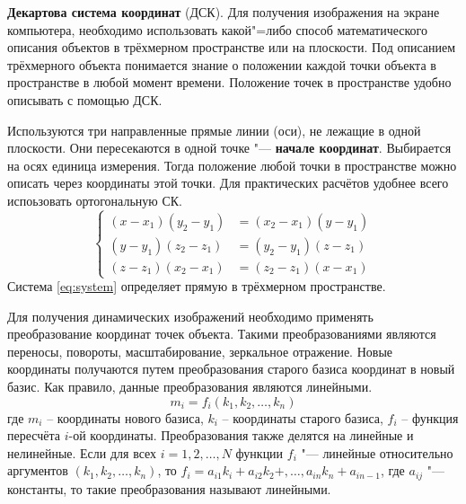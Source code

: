 \textbf{Декартова система координат} (ДСК). Для получения изображения на экране компьютера, необходимо использовать какой"=либо способ математического описания объектов в трёхмерном пространстве или на плоскости. Под описанием трёхмерного объекта понимается знание о положении каждой точки объекта в пространстве в любой момент времени. Положение точек в пространстве удобно описывать с помощью ДСК.

Используются три направленные прямые линии (оси), не лежащие в одной плоскости. Они пересекаются в одной точке "--- \textbf{начале координат}. Выбирается на осях единица измерения. Тогда положение любой точки в пространстве можно описать через координаты этой точки. Для практических расчётов удобнее всего испоьзовать ортогональную СК.
\begin{equation}\label{eq:system}
    \left\{
    \begin{aligned}
    (x - x_{1})(y_{2} - y_{1}) &= (x_{2} - x_{1})(y - y_{1}) \\
    (y - y_{1})(z_{2} - z_{1}) &= (y_{2} - y_{1})(z - z_{1}) \\
    (z - z_{1})(x_{2} - x_{1}) &= (z_{2} - z_{1})(x - x_{1})
    \end{aligned}
    \right.
\end{equation}
Система \ref{eq:system} определяет прямую в трёхмерном пространстве.

Для получения динамических изображений необходимо применять преобразование координат точек объекта. Такими преобразованиями являются переносы, повороты, масштабирование, зеркальное отражение. Новые координаты получаются путем преобразования старого базиса координат в новый базис. Как правило, данные преобразования являются линейными. 
\begin{equation*}
    m_{i} = f_{i}(k_{1}, k_{2}, \ldots, k_{n})
\end{equation*}
где $m_{i}$ – координаты нового базиса, $k_{i}$ – координаты старого базиса, $f_{i}$ – функция пересчёта $i$-ой координаты. Преобразования также делятся на линейные и нелинейные. Если для всех $i = 1, 2, \ldots, N$ функции $f_{i}$ "--- линейные относительно аргументов $(k_{1}, k_{2}, \ldots, k_{n})$, то $f_{i} = a_{i1}k_{i} + a_{i2}k_{2} +, \ldots, a_{in}k_{n} + a_{in-1}$, где $a_{ij}$ "--- константы, то такие преобразования называют линейными. 

